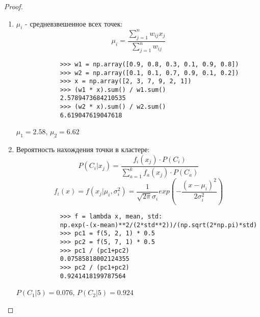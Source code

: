 \documentclass[12pt,a4paper]{article}
\begin{document}
\begin{proof}\hfill
  \begin{enumerate}[label=\Alph*., leftmargin=4\parindent]
    \item $\mu_i$ - средневзвешенное всех точек:
          $$
          \mu_i=\frac{\sum_{j=1}^{n} w_{ij} x_j}{\sum_{j=1}^{n} w_{ij}}
          $$
        
          \begin{verbatim}
            >>> w1 = np.array([0.9, 0.8, 0.3, 0.1, 0.9, 0.8])
            >>> w2 = np.array([0.1, 0.1, 0.7, 0.9, 0.1, 0.2])
            >>> x = np.array([2, 3, 7, 9, 2, 1])
            >>> (w1 * x).sum() / w1.sum()
            2.5789473684210535
            >>> (w2 * x).sum() / w2.sum()
            6.619047619047618
          \end{verbatim}

          $\mu_1=2.58$, $\mu_2=6.62$

    \item Вероятность нахождения точки в кластере:
          $$
          P(C_i|x_j)=\frac{f_i(x_j) \cdot P(C_i)}
                          {\sum_{a=1}^{k} f_a(x_j) \cdot P(C_a)}
          $$
          $$
          f_i(x)=f(x_j|\mu_i,\sigma_i^2)=\frac{1}{\sqrt{2\pi}\sigma_i}
          exp(-\frac{(x-\mu_i)^2}{2\sigma_i^2})
          $$

          \begin{verbatim}
            >>> f = lambda x, mean, std:
            np.exp(-(x-mean)**2/(2*std**2))/(np.sqrt(2*np.pi)*std)
            >>> pc1 = f(5, 2, 1) * 0.5
            >>> pc2 = f(5, 7, 1) * 0.5
            >>> pc1 / (pc1+pc2)
            0.07585818002124355
            >>> pc2 / (pc1+pc2)
            0.9241418199787564
          \end{verbatim}

          $P(C_1|5)=0.076$, $P(C_2|5)=0.924$
  \end{enumerate}
\end{proof}
\clearpage
\end{document}
